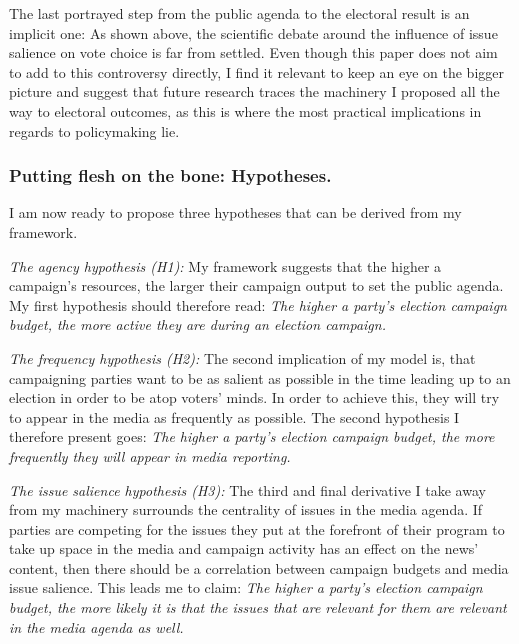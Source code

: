 \documentclass[11pt,a4paper]{article}
\begin{document}
The last portrayed step from the public agenda to the electoral result is an implicit one: As shown above, the scientific debate around the influence of issue salience on vote choice is far from settled. Even though this paper does not aim to add to this controversy directly, I find it relevant to keep an eye on the bigger picture and suggest that future research traces the machinery I proposed all the way to electoral outcomes, as this is where the most practical implications in regards to policymaking lie.


\subsubsection{Putting flesh on the bone: Hypotheses.}
I am now ready to propose three hypotheses that can be derived from my framework.

\textit{The agency hypothesis (H1):} My framework suggests that the higher a campaign’s resources, the larger their campaign output to set the public agenda. My first hypothesis should therefore read: \textit{The higher a party’s election campaign budget, the more active they are during an election campaign.}

\textit{The frequency hypothesis (H2):} The second implication of my model is, that campaigning parties want to be as salient as possible in the time leading up to an election in order to be atop voters’ minds. In order to achieve this, they will try to appear in the media as frequently as possible. The second hypothesis I therefore present goes: \textit{The higher a party’s election campaign budget, the more frequently they will appear in media reporting.}

\textit{The issue salience hypothesis (H3):} The third and final derivative I take away from my machinery surrounds the centrality of issues in the media agenda. If parties are competing for the issues they put at the forefront of their program to take up space in the media and campaign activity has an effect on the news’ content, then there should be a correlation between campaign budgets and media issue salience. This leads me to claim: \textit{The higher a party’s election campaign budget, the more likely it is that the issues that are relevant for them are relevant in the media agenda as well.}
\end{document}
